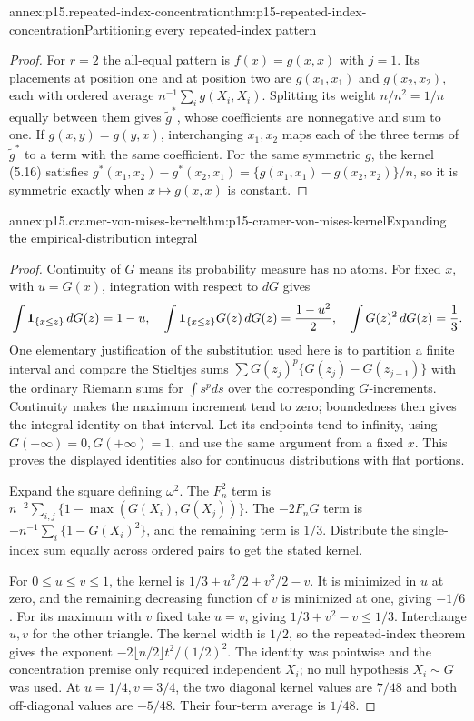 \begin{annexitem}{annex:p15.repeated-index-concentration}{thm:p15-repeated-index-concentration}{Partitioning every repeated-index pattern}
\begin{proof}
For \(r=2\) the all-equal pattern is \(f(x)=g(x,x)\) with \(j=1\).
Its placements at position one and at position two are \(g(x_1,x_1)\)
and \(g(x_2,x_2)\), each with ordered average \(n^{-1}\sum_ig(X_i,X_i)\).
Splitting its weight \(n/n^2=1/n\) equally between them gives
\(\tilde g^*\), whose coefficients are nonnegative and sum to one.
If \(g(x,y)=g(y,x)\), interchanging \(x_1,x_2\) maps each of the three
terms of \(\tilde g^*\) to a term with the same coefficient. For the
same symmetric \(g\), the kernel (5.16) satisfies
\(g^*(x_1,x_2)-g^*(x_2,x_1)=\{g(x_1,x_1)-g(x_2,x_2)\}/n\), so it is
symmetric exactly when \(x\mapsto g(x,x)\) is constant.
\end{proof}
\end{annexitem}

\begin{annexitem}{annex:p15.cramer-von-mises-kernel}{thm:p15-cramer-von-mises-kernel}{Expanding the empirical-distribution integral}
\begin{proof}
Continuity of \(G\) means its probability measure has no atoms.
For fixed \(x\), with \(u=G(x)\), integration with respect to \(dG\)
gives
\[
 \int{\bf1}_{\{x\leq z\}}\,dG(z)=1-u,\quad
 \int{\bf1}_{\{x\leq z\}}G(z)\,dG(z)=\frac{1-u^2}{2},\quad
 \int G(z)^2\,dG(z)=\frac13.
\]
One elementary justification of the substitution used here is to
partition a finite interval and compare the Stieltjes sums
\(\sum G(z_j)^p\{G(z_j)-G(z_{j-1})\}\) with the ordinary Riemann
sums for \(\int s^pds\) over the corresponding \(G\)-increments.
Continuity makes the maximum increment tend to zero; boundedness
then gives the integral identity on that interval. Let its endpoints
tend to infinity, using \(G(-\infty)=0,G(+\infty)=1\), and use the
same argument from a fixed \(x\). This proves the displayed identities
also for continuous distributions with flat portions.

Expand the square defining \(\omega^2\). The \(F_n^2\) term is
\(n^{-2}\sum_{i,j}\{1-\max(G(X_i),G(X_j))\}\).
The \(-2F_nG\) term is
\(-n^{-1}\sum_i\{1-G(X_i)^2\}\), and the remaining term is \(1/3\).
Distribute the single-index sum equally across ordered pairs to get
the stated kernel.

For \(0\leq u\leq v\leq1\), the kernel is
\(1/3+u^2/2+v^2/2-v\).
It is minimized in \(u\) at zero, and the remaining decreasing function
of \(v\) is minimized at one, giving \(-1/6\).
For its maximum with \(v\) fixed take \(u=v\), giving
\(1/3+v^2-v\leq1/3\). Interchange \(u,v\) for the other triangle.
The kernel width is \(1/2\), so the repeated-index theorem gives
the exponent \(-2\lfloor n/2\rfloor t^2/(1/2)^2\).
The identity was pointwise and the concentration premise only required
independent \(X_i\); no null hypothesis \(X_i\sim G\) was used.
At \(u=1/4,v=3/4\), the two diagonal kernel values are \(7/48\)
and both off-diagonal values are \(-5/48\).
Their four-term average is \(1/48\).


\end{proof}
\end{annexitem}
